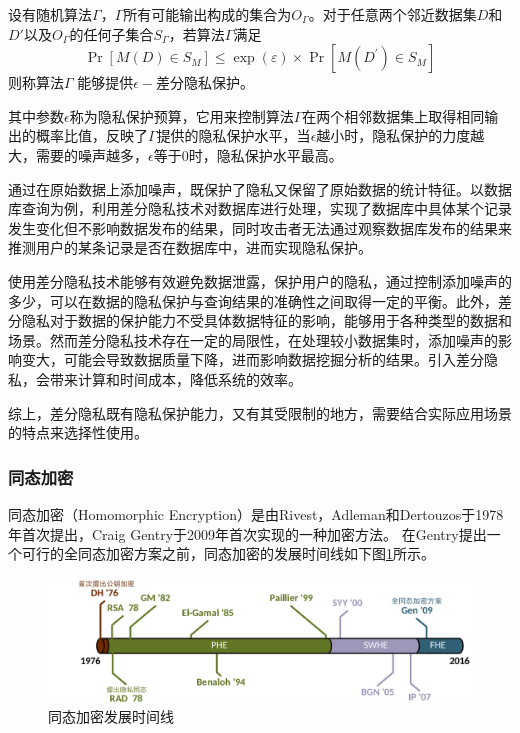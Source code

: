 \begin{definition}
	设有随机算法$ \varGamma $，$ \varGamma $所有可能输出构成的集合为$ O_{\varGamma} $。对于任意两个邻近数据集$ D $和$ D' $以及$ O_{\varGamma} $的任何子集合$ S_{\varGamma} $，若算法$ \varGamma $满足
	\begin{equation}
		\operatorname{Pr}\left[M(D) \in S_M\right] \leq \exp (\varepsilon) \times \operatorname{Pr}\left[M\left(D^{\prime}\right) \in S_M\right]
	\end{equation}
	则称算法$ \varGamma $ 能够提供$ \epsilon -$差分隐私保护。
\end{definition}

其中参数$ \epsilon $称为隐私保护预算，它用来控制算法$ \varGamma $在两个相邻数据集上取得相同输出的概率比值，反映了$ \varGamma $提供的隐私保护水平，当$ \epsilon $越小时，隐私保护的力度越大，需要的噪声越多，$ \epsilon $等于0时，隐私保护水平最高。

通过在原始数据上添加噪声，既保护了隐私又保留了原始数据的统计特征。以数据库查询为例，利用差分隐私技术对数据库进行处理，实现了数据库中具体某个记录发生变化但不影响数据发布的结果，同时攻击者无法通过观察数据库发布的结果来推测用户的某条记录是否在数据库中，进而实现隐私保护。

使用差分隐私技术能够有效避免数据泄露，保护用户的隐私，通过控制添加噪声的多少，可以在数据的隐私保护与查询结果的准确性之间取得一定的平衡。此外，差分隐私对于数据的保护能力不受具体数据特征的影响，能够用于各种类型的数据和场景。然而差分隐私技术存在一定的局限性，在处理较小数据集时，添加噪声的影响变大，可能会导致数据质量下降，进而影响数据挖掘分析的结果。引入差分隐私，会带来计算和时间成本，降低系统的效率。

综上，差分隐私既有隐私保护能力，又有其受限制的地方，需要结合实际应用场景的特点来选择性使用。

\subsubsection{同态加密}
同态加密（Homomorphic Encryption）是由Rivest，Adleman和Dertouzos\cite{rivest1978data}于1978年首次提出，Craig Gentry\cite{gentry2009fully}于2009年首次实现的一种加密方法。
在Gentry提出一个可行的全同态加密方案之前，同态加密的发展时间线\cite{acar2018survey}如下图\ref{timeline}所示。

\begin{figure}[htbp]
	\centering
	\includegraphics[scale=0.17]{img/timeline.png}
	\caption{同态加密发展时间线}
	\label{timeline}
\end{figure}


